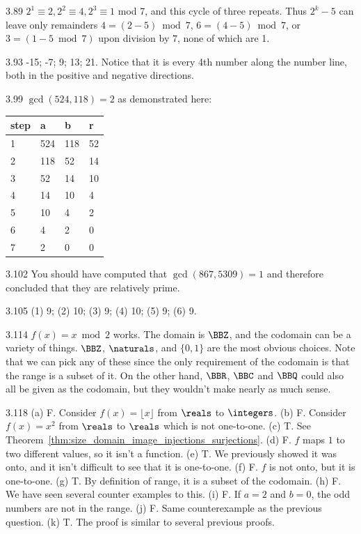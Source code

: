 \begin{Answer}{3.89}
 $2^1 \equiv 2, 2^2
\equiv 4, 2^3 \equiv 1$ mod 7, and this cycle of three repeats.
Thus $2^k - 5$ can leave only remainders
$4=(2-5)\bmod 7$, $6=(4-5)\bmod 7$, or $3=(1-5\bmod 7)$ upon
division by $7$, none of which are 1.
\end{Answer}
\begin{Answer}{3.93}
-15; -7; 9; 13; 21.  Notice that it is every 4th number along the number line, both in the
positive and negative directions.
\end{Answer}
\begin{Answer}{3.99}
$\gcd(524,118)=2$ as demonstrated here:

\begin{tabular}{|l|l|l|l|}
\hline
step&a&b&r\\
\hline
\hline
1&524&118&52\\
\hline
2&118&52&14\\
\hline
3&52&14&10\\
\hline
4&14&10&4\\
\hline
5&10&4&2\\
\hline
6&4&2&0\\
\hline
7&2&0&0\\
\hline
\end{tabular}
\end{Answer}
\begin{Answer}{3.102}
You should have computed that $\gcd(867,5309)=1$ and therefore
concluded that they are relatively prime.
\end{Answer}
\begin{Answer}{3.105}
(1) 9; (2) 10; (3) 9; (4) 10; (5) 9; (6) 9.
\end{Answer}
\begin{Answer}{3.114}
$f(x)=x\bmod 2$ works.  The domain is $\BBZ$, and the codomain can be a variety
of things.  $\BBZ$, $\naturals$, and $\{0,1\}$ are the most obvious choices.
Note that we can pick any of these since the only requirement of the codomain is
that the range is a subset of it.  On the other hand, $\BBR$, $\BBC$ and $\BBQ$
could also all be given as the codomain, but they wouldn't make nearly as much sense.
\end{Answer}
\begin{Answer}{3.118}
(a) F.  Consider $f(x)=\lfloor x \rfloor$ from $\reals$ to $\integers$.
(b) F.  Consider $f(x)=x^2$ from $\reals$ to $\reals$ which is not one-to-one.
(c) T.  See Theorem~\ref{thm:size_domain_image_injections_surjections}.
(d) F.  $f$ maps $1$ to two different values, so it isn't a function.
(e) T.  We previously showed it was onto, and it isn't difficult to see that it is one-to-one.
(f) F. $f$ is not onto, but it is one-to-one.
(g) T.  By definition of range, it is a subset of the codomain.
(h) F.  We have seen several counter examples to this.
(i) F.  If $a=2$ and $b=0$, the odd numbers are not in the range.
(j) F.  Same counterexample as the previous question.
(k) T.  The proof is similar to several previous proofs.
\end{Answer}
